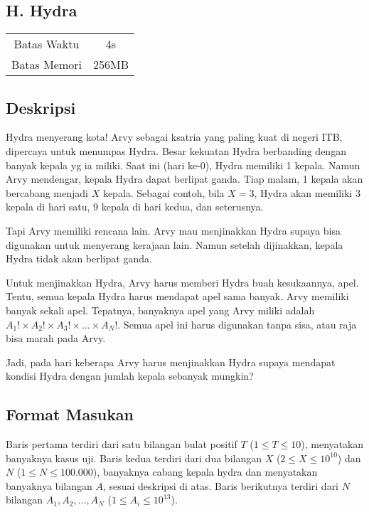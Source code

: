 \documentclass{article}
\begin{document}
\begin{center}
    \section*{H. Hydra} %

    \begin{tabular}{ | c c | }
        \hline
        Batas Waktu  & 4s \\    %
        Batas Memori & 256MB \\  %
        \hline
    \end{tabular}
\end{center}

\subsection*{Deskripsi}

Hydra menyerang kota! Arvy sebagai ksatria yang paling kuat di negeri ITB, dipercaya untuk menumpas Hydra.
Besar kekuatan Hydra berbanding dengan banyak kepala yg ia miliki.
Saat ini (hari ke-0), Hydra memiliki 1 kepala. Namun Arvy mendengar, kepala Hydra dapat berlipat ganda.
Tiap malam, 1 kepala akan bercabang menjadi $X$ kepala.
Sebagai contoh, bila $X = 3$, Hydra akan memiliki 3 kepala di hari satu, 9 kepala di hari kedua, dan seterusnya.

Tapi Arvy memiliki rencana lain. Arvy mau menjinakkan Hydra supaya bisa digunakan untuk menyerang kerajaan lain.
Namun setelah dijinakkan, kepala Hydra tidak akan berlipat ganda.

Untuk menjinakkan Hydra, Arvy harus memberi Hydra buah kesukaannya, apel.
Tentu, semua kepala Hydra harus mendapat apel sama banyak.
Arvy memiliki banyak sekali apel.
Tepatnya, banyaknya apel yang Arvy miliki adalah $A_1! \times A_2! \times A_3! \times \dots \times A_N!$.
Semua apel ini harus digunakan tanpa sisa, atau raja bisa marah pada Arvy.

Jadi, pada hari keberapa Arvy harus menjinakkan Hydra supaya mendapat kondisi Hydra dengan jumlah kepala sebanyak mungkin?

\subsection*{Format Masukan}
Baris pertama terdiri dari satu bilangan bulat positif $T$ ($1 \leq T \leq 10$), menyatakan banyaknya kasus uji.
Baris kedua terdiri dari dua bilangan $X$ ($2 \leq X \leq {10}^{10}$) dan $N$ ($1 \leq N \leq 100.000$), banyaknya cabang kepala hydra dan menyatakan banyaknya bilangan $A$, sesuai deskripsi di atas.
Baris berikutnya terdiri dari $N$ bilangan $A_1, A_2, \dots, A_N$ ($1 \leq A_i \leq {10}^{13}$).
\end{document}
